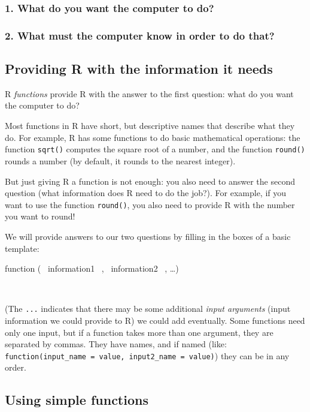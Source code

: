 \documentclass[
  letterpaper,
  DIV=11,
  numbers=noendperiod]{scrreprt}
\theoremstyle{remark}
\begin{document}
\subsubsection{1. What do you want the computer to
do?}\label{what-do-you-want-the-computer-to-do}

\subsubsection{2. What must the computer know in order to do
that?}\label{what-must-the-computer-know-in-order-to-do-that}

\subsection{Providing R with the information it
needs}\label{providing-r-with-the-information-it-needs}

R \emph{functions} provide R with the answer to the first question: what
do you want the computer to do?

Most functions in R have short, but descriptive names that describe what
they do. For example, R has some functions to do basic mathematical
operations: the function \texttt{sqrt()} computes the square root of a
number, and the function \texttt{round()} rounds a number (by default,
it rounds to the nearest integer).

But just giving R a function is not enough: you also need to answer the
second question (what information does R need to do the job?). For
example, if you want to use the function \texttt{round()}, you also need
to provide R with the number you want to round!

We will provide answers to our two questions by filling in the boxes of
a basic template:

{function} ( ~information1~ , ~information2~ , \ldots)

~

(The \texttt{...} indicates that there may be some additional
\emph{input arguments} (input information we could provide to R) we
could add eventually. Some functions need only one input, but if a
function takes more than one argument, they are separated by commas.
They have names, and if named (like:
\texttt{function(input\_name\ =\ value,\ input2\_name\ =\ \textquotesingle{}value\textquotesingle{})})
they can be in any order.

\subsection{Using simple functions}\label{using-simple-functions}
\end{document}
